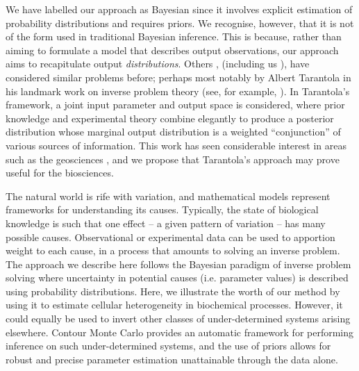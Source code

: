 We have labelled our approach as Bayesian since it involves explicit estimation of probability distributions and requires priors. We recognise, however, that it is not of the form used in traditional Bayesian inference. This is because, rather than aiming to formulate a model that describes output observations, our approach aims to recapitulate output \emph{distributions}. Others \cite{BJW-18}, (including us \cite{lambert2018inverse}), have considered similar problems before; perhaps most notably by Albert Tarantola in his landmark work on inverse problem theory (see, for example, \cite{tarantola2005inverse}). In Tarantola's framework, a joint input parameter and output space is considered, where prior knowledge and experimental theory combine elegantly to produce a posterior distribution whose marginal output distribution is a weighted ``conjunction'' of various sources of information. This work has seen considerable interest in areas such as the geosciences \cite{mosegaard1995monte,vukicevic2008analysis}, and we propose that Tarantola's approach may prove useful for the biosciences.


The natural world is rife with variation, and mathematical models represent frameworks for understanding its causes. Typically, the state of biological knowledge is such that one effect -- a given pattern of variation -- has many possible causes. Observational or experimental data can be used to apportion weight to each cause, in a process that amounts to solving an inverse problem. The approach we describe here follows the Bayesian paradigm of inverse problem solving where uncertainty in potential causes (i.e. parameter values) is described using probability distributions. Here, we illustrate the worth of our method by using it to estimate cellular heterogeneity in biochemical processes. However, it could equally be used to invert other classes of under-determined systems arising elsewhere. Contour Monte Carlo provides an automatic framework for performing inference on such under-determined systems, and the use of priors allows for robust and precise parameter estimation unattainable through the data alone.

